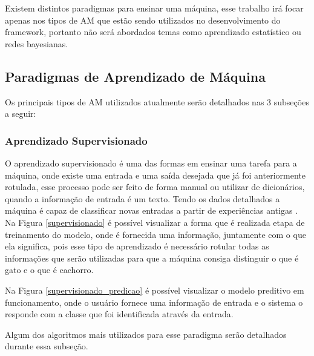     Existem distintos paradigmas para ensinar uma máquina, esse trabalho irá focar apenas nos tipos de \acrshort{AM} que estão sendo utilizados no desenvolvimento do framework,
    portanto não será abordados temas como aprendizado estatístico ou redes bayesianas.

  \subsection{Paradigmas de Aprendizado de Máquina}

    Os principais tipos de \acrshort{AM} utilizados atualmente serão detalhados nas 3 subseções a seguir:

    \subsubsection{Aprendizado Supervisionado}

      O aprendizado supervisionado é uma das formas em ensinar uma tarefa para a máquina, onde existe uma entrada e uma saída desejada que já foi 
      anteriormente rotulada, esse processo pode ser feito de forma manual ou utilizar de dicionários, quando a informação de entrada é um texto.
      Tendo os dados detalhados a máquina é capaz de classificar novas entradas a partir de experiências antigas \cite{mitchell}. Na Figura \ref{supervisionado} é possível visualizar 
      a forma que é realizada etapa de treinamento do modelo, onde é fornecida uma informação, juntamente com o que ela significa, pois esse tipo de aprendizado 
      é necessário rotular todas as informações que serão utilizadas para que a máquina consiga distinguir o que é gato e o que é cachorro.
      


      Na Figura \ref{supervisionado_predicao} é possível visualizar o modelo preditivo em funcionamento, onde o usuário fornece uma informação de entrada
      e o sistema o responde com a classe que foi identificada através da entrada.



      Algum dos algoritmos mais utilizados para esse paradigma serão detalhados durante essa subseção.

